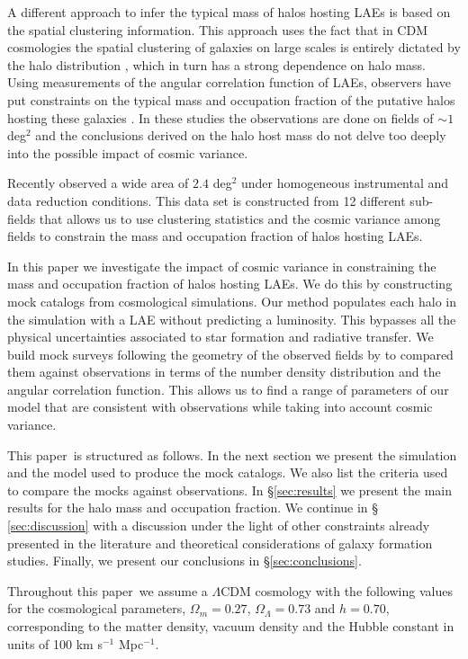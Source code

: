 \documentclass{emulateapj}
\newcommand{\documentname}{paper~}
\newcommand{\ly}{{\ifmmode{{\rm Ly}\alpha}\else{Ly$\alpha$~}\fi}}
\begin{document}
A different approach to infer the typical mass of halos hosting
LAEs is based on the spatial clustering information. This approach uses the fact
that in CDM cosmologies the spatial clustering of galaxies on large
scales is entirely dictated by the halo distribution
\citep{Colberg00}, which in turn has a strong dependence on halo
mass. Using measurements of the angular correlation function of LAEs,
observers have put constraints on the typical mass and occupation
fraction of the putative halos hosting these galaxies
\citep{Hayashino2004,Gawiser07,Nilsson2007,Ouchi2010}. In these
studies the observations are done on fields of $\sim 1$ deg$^{2}$ and
the conclusions derived on the halo host mass do not delve too deeply
into the possible impact of cosmic variance.  

Recently \cite{Yamada2012} observed a wide area of $2.4$ deg$^{2}$
under homogeneous instrumental and data reduction conditions. This data
set is constructed from 12 different sub-fields that allows us to use
clustering statistics and the cosmic variance among fields to
constrain the mass and occupation fraction of halos hosting LAEs. 


In this paper we investigate the impact of cosmic variance in
constraining the mass and occupation fraction of halos hosting LAEs.
We do this by constructing mock catalogs from cosmological simulations.
Our method populates each halo in the simulation with a LAE without
predicting a \ly  luminosity. This bypasses all the physical
uncertainties associated to star formation and radiative transfer.
We build mock surveys following the geometry of the observed fields by
\cite{Yamada2012} to compared them  against observations in terms of
the number density distribution and the angular correlation
function. This allows us to find a range of parameters of our model
that are consistent with observations while taking into account
cosmic variance.
 

This \documentname is structured as follows. In the next section we present
the simulation and the model used to produce the mock catalogs. We
also list the criteria used to compare the mocks against
observations. In \S \ref{sec:results} we present the main results for
the halo mass and occupation fraction. We continue in \S
\ref{sec:discussion} with a discussion under the light of other
constraints already presented in the literature and theoretical
considerations of galaxy formation studies. Finally, we present our
conclusions in \S \ref{sec:conclusions}.   

Throughout this \documentname we assume a $\Lambda$CDM cosmology with the
following values for the cosmological parameters, $\Omega_{m}=0.27$,
$\Omega_{\Lambda}=0.73$ and $h=0.70$, corresponding to the matter
density, vacuum density and the Hubble constant in units of 100 km
s$^{-1}$ Mpc$^{-1}$. 
\end{document}

